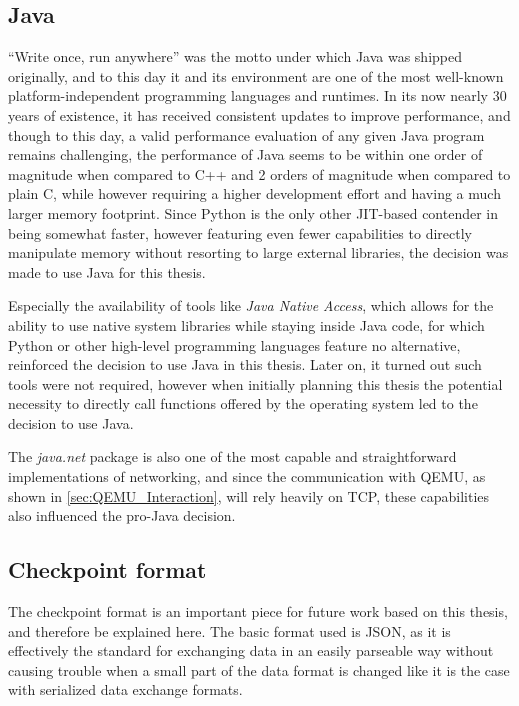 \subsection{Java}
\enquote{Write once, run anywhere}\cite{WORA} was the motto under which Java was shipped originally,
and to this day it and its environment are one of the most well-known platform-independent
programming languages and runtimes.
In its now nearly 30 years of existence, it has received consistent updates to improve performance,
and though to this day, a valid performance evaluation of any given Java program remains challenging\cite{Java_Benchmarking},
the performance of Java seems to be within one order of magnitude when compared to C++ and 2 orders of magnitude when compared to plain C,
while however requiring a higher development effort and having a much larger memory footprint\cite{Java_Performance}.
Since Python is the only other JIT-based contender in  being somewhat faster,
however featuring even fewer capabilities to directly manipulate memory without
resorting to large external libraries, the decision was made to use Java for this thesis.

\label{JNA}
Especially the availability of tools like \emph{Java Native Access}\cite{JNA},
which allows for the ability to use native system libraries while staying inside Java code,
for which Python or other high-level programming languages feature no alternative,
reinforced the decision to use Java in this thesis.
Later on, it turned out such tools were not required, however when initially planning this thesis
the potential necessity to directly call functions offered by the operating system led to the decision to use Java.

The \emph{java.net} package is also one of the most capable and straightforward implementations of networking,
and since the communication with QEMU, as shown in \autoref{sec:QEMU_Interaction}, will rely heavily on TCP,
these capabilities also influenced the pro-Java decision.

\subsection{Checkpoint format}
The checkpoint format is an important piece for future work based on this thesis,
and therefore be explained here.
The basic format used is JSON, as it is effectively the standard for exchanging data
in an easily parseable way without causing trouble when a small part of the data format is changed
like it is the case with serialized data exchange formats.

